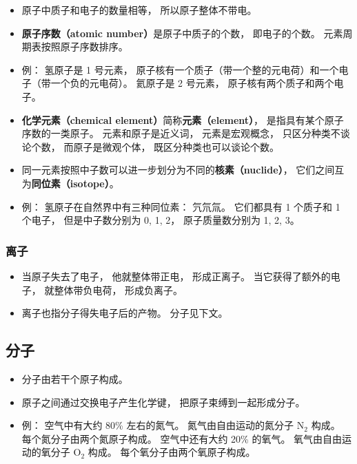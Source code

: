 \begin{itemize}
\item 原子中质子和电子的数量相等， 所以原子整体不带电。
\item \textbf{原子序数（atomic number）}是原子中质子的个数， 即电子的个数。 元素周期表按照原子序数排序。
\item 例： 氢原子是 1 号元素， 原子核有一个质子（带一个整的元电荷）和一个电子（带一个负的元电荷）。 氦原子是 2 号元素， 原子核有两个质子和两个电子。
\item \textbf{化学元素（chemical element）}简称\textbf{元素（element）}， 是指具有某个原子序数的一类原子。 元素和原子是近义词， 元素是宏观概念， 只区分种类不谈论个数， 而原子是微观个体， 既区分种类也可以谈论个数。
\item 同一元素按照中子数可以进一步划分为不同的\textbf{核素（nuclide）}， 它们之间互为\textbf{同位素（isotope）}。
\item 例： 氢原子在自然界中有三种同位素： 氕氘氚。 它们都具有 1 个质子和 1 个电子， 但是中子数分别为 0, 1, 2， 原子质量数分别为 1, 2, 3。
\end{itemize}

\subsubsection{离子}
\begin{itemize}
\item 当原子失去了电子， 他就整体带正电， 形成正离子。 当它获得了额外的电子， 就整体带负电荷， 形成负离子。
\item 离子也指分子得失电子后的产物。 分子见下文。
\end{itemize}

\subsection{分子}
\begin{itemize}
\item 分子由若干个原子构成。
\item 原子之间通过交换电子产生化学键， 把原子束缚到一起形成分子。
\item 例： 空气中有大约 80\% 左右的氮气。 氮气由自由运动的氮分子 $\mathrm{N}_2$ 构成。 每个氮分子由两个氮原子构成。 空气中还有大约 20\% 的氧气。 氧气由自由运动的氧分子 $\mathrm{O}_2$ 构成。 每个氧分子由两个氧原子构成。
\end{itemize}
